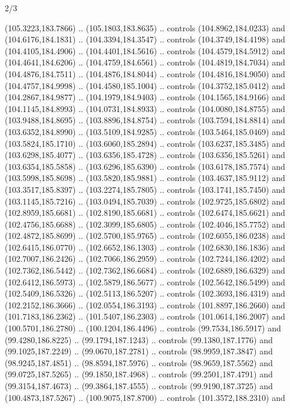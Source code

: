 \begin{flagdescription}{2/3}
\begin{scope}[shift={(0.5\flaglength,0.5)},scale=\flagwidth/320]
\begin{scope}[y=0.8pt, x=0.8pt, yscale=-1,shift={(-118.3,-146)}]
  (105.3223,183.7866) .. (105.1803,183.8635) .. controls (104.8962,184.0233) and
  (104.6176,184.1831) .. (104.3394,184.3547) .. controls (104.3749,184.4198) and
  (104.4105,184.4906) .. (104.4401,184.5616) .. controls (104.4579,184.5912) and
  (104.4641,184.6206) .. (104.4759,184.6561) .. controls (104.4819,184.7034) and
  (104.4876,184.7511) .. (104.4876,184.8044) .. controls (104.4816,184.9050) and
  (104.4757,184.9998) .. (104.4580,185.1004) .. controls (104.3752,185.0412) and
  (104.2867,184.9877) .. (104.1979,184.9403) .. controls (104.1565,184.9166) and
  (104.1145,184.8993) .. (104.0731,184.8933) .. controls (104.0080,184.8755) and
  (103.9488,184.8695) .. (103.8896,184.8754) .. controls (103.7594,184.8814) and
  (103.6352,184.8990) .. (103.5109,184.9285) .. controls (103.5464,185.0469) and
  (103.5824,185.1710) .. (103.6060,185.2894) .. controls (103.6237,185.3485) and
  (103.6298,185.4077) .. (103.6356,185.4728) .. controls (103.6356,185.5261) and
  (103.6354,185.5858) .. (103.6296,185.6390) .. controls (103.6178,185.7574) and
  (103.5998,185.8698) .. (103.5820,185.9881) .. controls (103.4637,185.9112) and
  (103.3517,185.8397) .. (103.2274,185.7805) .. controls (103.1741,185.7450) and
  (103.1145,185.7216) .. (103.0494,185.7039) .. controls (102.9725,185.6802) and
  (102.8959,185.6681) .. (102.8190,185.6681) .. controls (102.6474,185.6621) and
  (102.4756,185.6688) .. (102.3099,185.6805) .. controls (102.4046,185.7752) and
  (102.4872,185.8699) .. (102.5700,185.9765) .. controls (102.6055,186.0238) and
  (102.6415,186.0770) .. (102.6652,186.1303) .. controls (102.6830,186.1836) and
  (102.7007,186.2426) .. (102.7066,186.2959) .. controls (102.7244,186.4202) and
  (102.7362,186.5442) .. (102.7362,186.6684) .. controls (102.6889,186.6329) and
  (102.6412,186.5973) .. (102.5879,186.5677) .. controls (102.5642,186.5499) and
  (102.5409,186.5326) .. (102.5113,186.5207) .. controls (102.3693,186.4319) and
  (102.2152,186.3666) .. (102.0554,186.3193) .. controls (101.8897,186.2660) and
  (101.7183,186.2362) .. (101.5407,186.2303) .. controls (101.0614,186.2007) and
  (100.5701,186.2780) .. (100.1204,186.4496) .. controls (99.7534,186.5917) and
  (99.4280,186.8225) .. (99.1794,187.1243) .. controls (99.1380,187.1776) and
  (99.1025,187.2249) .. (99.0670,187.2781) .. controls (98.9959,187.3847) and
  (98.9245,187.4851) .. (98.8594,187.5976) .. controls (98.9659,187.5562) and
  (99.0725,187.5265) .. (99.1850,187.4968) .. controls (99.2501,187.4791) and
  (99.3154,187.4673) .. (99.3864,187.4555) .. controls (99.9190,187.3725) and
  (100.4873,187.5267) .. (100.9075,187.8700) .. controls (101.3572,188.2310) and

\end{scope}
\end{scope}
\end{flagdescription}
